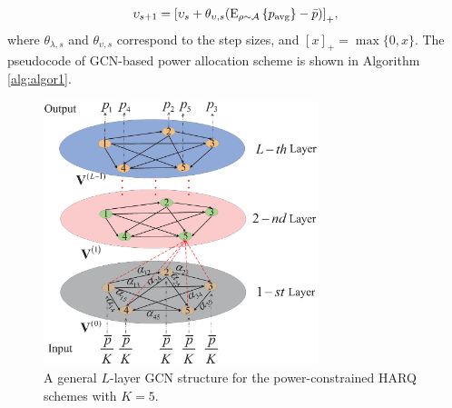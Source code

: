 \documentclass[conference]{IEEEtran}
\begin{document}
\begin{equation}\label{eqn:optstepb}
{\upsilon _{s + 1}} = {\left[ {{\upsilon _s} + {\theta _{{\upsilon },s}}({{\rm E}_{\rho  \sim \mathcal A}}\left\{p_{\rm avg}\right\} - \bar p)} \right]_ + },
\end{equation}
where ${\theta _{{\lambda },s}}$ and ${\theta _{{\upsilon },s}}$ correspond to the step sizes, and $[x]_+ = \max\{0,x\}$. The pseudocode of GCN-based power allocation scheme is shown in Algorithm \ref{alg:algor1}.


\begin{figure}[htbp]
    \centering
    \includegraphics[width=8cm]{graphreprsent3.eps}
    \caption{A general $L$-layer GCN structure for the power-constrained HARQ schemes with $K=5$.} %
    \label{FIG2} %
\end{figure}


%
%
\end{document}

